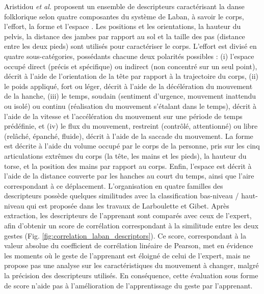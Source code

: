 Aristidou \textit{et al.} proposent un ensemble de descripteurs caractérisant la danse folklorique selon quatre composantes du système de Laban, à savoir le corps, l'effort, la forme et l'espace \parencite{Aristidou2015FDE}. Les positions et les orientations, la hauteur du pelvis, la distance des jambes par rapport au sol et la taille des pas (distance entre les deux pieds) sont utilisés pour caractériser le corps. L'effort est divisé en quatre sous-catégories, possédants chacune deux polarités possibles : (i) l'espace occupé direct (précis et spécifique) ou indirect (non concentré sur un seul point), décrit à l'aide de l'orientation de la tête par rapport à la trajectoire du corps, (ii) le poids appliqué, fort ou léger, décrit à l'aide de la décélération du mouvement de la hanche, (iii) le temps, soudain (sentiment d'urgence, mouvement inattendu ou isolé) ou continu (réalisation du mouvement s'étalant dans le temps), décrit à l'aide de la vitesse et l'accélération du mouvement sur une période de temps prédéfinie, et (iv) le flux du mouvement, restreint (contrôlé, attentionné) ou libre (relâché, épanché, fluide), décrit à l'aide de la saccade du mouvement. La forme est décrite à l'aide du volume occupé par le corps de la personne, pris sur les cinq articulations extrêmes du corps (la tête, les mains et les pieds), la hauteur du torse, et la position des mains par rapport au corps. Enfin, l'espace est décrit à l'aide de la distance couverte par les hanches au court du temps, ainsi que l'aire correspondant à ce déplacement. L'organisation en quatre familles des descripteurs possède quelques similitudes avec la classification bas-niveau / haut-niveau qui est proposée dans les travaux de Larboulette et Gibet. Après extraction, les descripteurs de l'apprenant sont comparés avec ceux de l'expert, afin d'obtenir un score de corrélation correspondant à la similitude entre les deux gestes (Fig. \ref{fig:correlation_laban_descriptors}). Ce score, correspondant à la valeur absolue du coefficient de corrélation linéaire de Pearson, met en évidence les moments où le geste de l'apprenant est éloigné de celui de l'expert, mais ne propose pas une analyse sur les caractéristiques du mouvement à changer, malgré la précision des descripteurs utilisés. En conséquence, cette évaluation sous forme de score n'aide pas à l'amélioration de l'apprentissage du geste par l'apprenant.

